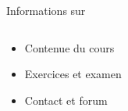 \begin{frame}{Informations sur} 

  \begin{alertblock}{}

    \begin{columns}
      \begin{column}{.5\textwidth}
        \begin{itemize}
        \item Contenue du cours
         \item Exercices et examen 
         \item Contact et forum
         \end{itemize}
       \end{column}
       \begin{column}{.5\textwidth}
       \end{column}
       
    \end{columns}
      
     \end{alertblock}
          \begin{center}
%              
     \end{center}    
    
  
   \end{frame}
   



